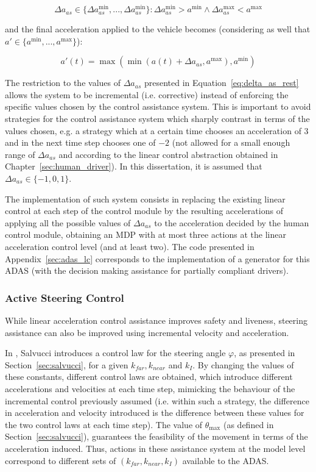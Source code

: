 \begin{equation}
\label{eq:delta_as_rest}
	\Delta a_{as} \in \{\Delta a_{as}^{\min},...,\Delta a_{as}^{\min}\}: \Delta a_{as}^{\min} > a^{\min} \wedge \Delta a_{as}^{\max} < a^{\max}
\end{equation}

and the final acceleration applied to the vehicle becomes (considering as well that $a' \in \{a^{\min},...,a^{\max}\}$):

\begin{equation}
	a'(t) = \max (\min (a(t) + \Delta a_{as}, a^{\max}), a^{\min})
\end{equation}

The restriction to the values of $\Delta a_{as}$ presented in Equation~\ref{eq:delta_as_rest} allows the system to be incremental (i.e. corrective) instead of enforcing the specific values chosen by the control assistance system. This is important to avoid strategies for the control assistance system which sharply contrast in terms of the values chosen, e.g. a strategy which at a certain time chooses an acceleration of $3$ and in the next time step chooses one of $-2$ (not allowed for a small enough range of $\Delta a_{as}$ and according to the linear control abstraction obtained in Chapter~\ref{sec:human_driver}). In this dissertation, it is assumed that $\Delta a_{as} \in \{-1,0,1\}$.

The implementation of such system consists in replacing the existing linear control at each step of the control module by the resulting accelerations of applying all the possible values of $\Delta a_{as}$ to the acceleration decided by the human control module, obtaining an MDP with at most three actions at the linear acceleration control level (and at least two). The code presented in Appendix~\ref{sec:adas_lc} corresponds to the implementation of a generator for this ADAS (with the decision making assistance for partially compliant drivers).

\subsubsection{Active Steering Control}

While linear acceleration control assistance improves safety and liveness, steering assistance can also be improved using incremental velocity and acceleration. 

In \cite{salvucci_1}, Salvucci introduces a control law for the steering angle $\varphi$, as presented in Section~\ref{sec:salvucci}, for a given $k_{far}, k_{near}$ and $k_I$. By changing the values of these constants, different control laws are obtained, which introduce different accelerations and velocities at each time step, mimicking the behaviour of the incremental control previously assumed (i.e. within such a strategy, the difference in acceleration and velocity introduced is the difference between these values for the two control laws at each time step). The value of $\theta_{\max}$ (as defined in Section~\ref{sec:salvucci}), guarantees the feasibility of the movement in terms of the acceleration induced. Thus, actions in these assistance system at the model level correspond to different sets of $(k_{far}, k_{near},k_I)$ available to the ADAS.

